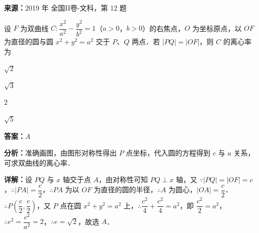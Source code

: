 \begin{question}[points=5]
\textbf{来源：}2019 年 全国II卷-文科，第 12 题\par
设 $F$ 为双曲线 $C:\dfrac{x^2}{a^2}-\dfrac{y^2}{b^2}=1$（$a>0$，$b>0$）的右焦点，$O$ 为坐标原点，以 $OF$ 为直径的圆与圆 $x^2+y^2=a^2$ 交于 $P$、$Q$ 两点．若 $|PQ|=|OF|$，则 $C$ 的离心率为
\begin{choices}
  \item $\sqrt{2}$
  \item $\sqrt{3}$
  \item $2$
  \item $\sqrt{5}$
\end{choices}
\begin{solution}
\textbf{答案：}$A$

\textbf{分析：}准确画图，由图形对称性得出 $P$ 点坐标，代入圆的方程得到 $c$ 与 $a$ 关系，可求双曲线的离心率．

\textbf{详解：}设 $PQ$ 与 $x$ 轴交于点 $A$，由对称性可知 $PQ\perp x$ 轴，又 $\because |PQ|=|OF|=c$，$\therefore |PA|=\dfrac{c}{2}$，$\therefore PA$ 为以 $OF$ 为直径的圆的半径，$\therefore A$ 为圆心，$|OA|=\dfrac{c}{2}$．$\therefore P\left(\dfrac{c}{2},\dfrac{c}{2}\right)$，又 $P$ 点在圆 $x^2+y^2=a^2$ 上，$\therefore \dfrac{c^2}{4}+\dfrac{c^2}{4}=a^2$，即 $\dfrac{c^2}{2}=a^2$，$\therefore e^2=\dfrac{c^2}{a^2}=2$，$\therefore e=\sqrt{2}$，故选 $A$．
\end{solution}
\end{question}

